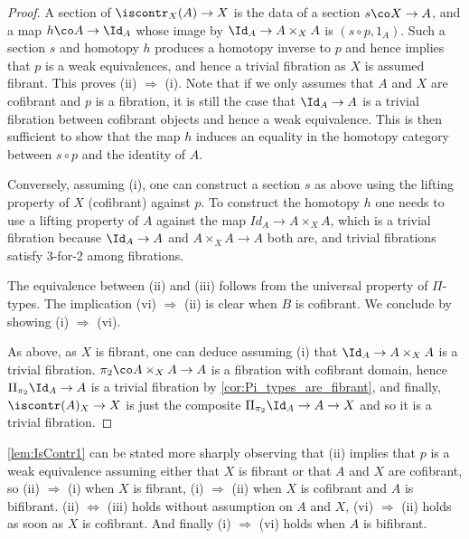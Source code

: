 \begin{proof} A section of $\iscontr_X (A) \to X$ is  the data of a section $s \co X \rightarrow A$, and a map $h \co A \to \Id_A$ whose image by $\Id_A \to A \times_X A$ is $(s \circ p, 1_A)$. Such a section $s$ and homotopy $h$ produces a homotopy inverse to $p$ and hence implies that $p$ is a weak equivalences, and hence a trivial fibration as $X$ is assumed fibrant.  This proves (ii) $\Rightarrow$ (i).
Note that if we only assumes that $A$ and $X$ are cofibrant and $p$ is a fibration, it is still the case that $\Id_A \to A$ is a trivial fibration between cofibrant objects and hence a weak equivalence. This is then sufficient to show that the map $h$ induces an equality in the homotopy category between $s \circ p $ and the identity of $A$.


Conversely, assuming (i), one can construct a section $s$ as above using the lifting property of $X$ (cofibrant) against $p$. To construct the homotopy $h$ one needs to use a lifting property of $A$ against the map $Id_A \to A \times_X A$, which is a trivial fibration because $\Id_A \to A$ and $A \times_X A \to A$ both are, and trivial fibrations satisfy 3-for-2 among fibrations.

The equivalence between (ii) and (iii) follows from the universal property of $\Pi$-types.
The implication (vi) $\Rightarrow$ (ii) is clear when $B$ is cofibrant. We conclude by showing (i) $\Rightarrow$ (vi).

As above, as $X$ is fibrant, one can deduce assuming (i) that $\Id_A \to A \times_X A$ is a trivial fibration. $\pi_2 \co A \times_X A \to A$ is a fibration with cofibrant domain, hence $\Pi_{\pi_2} \Id_A \rightarrow A$ is a trivial fibration by \cref{cor:Pi_types_are_fibrant}, and finally, $\iscontr(A)_X \rightarrow X$ is just the composite $\Pi_{\pi_2} \Id_A \rightarrow A \rightarrow X$ and so it is  a trivial fibration.
\end{proof}

\begin{remark} \label{lem:IsContr1-sharp}
 \cref{lem:IsContr1} can be stated more sharply observing that (ii) implies that $p$ is a weak equivalence assuming either that $X$ is fibrant or that $A$ and $X$ are cofibrant, so (ii) $\Rightarrow$ (i) when $X$ is fibrant, (i) $\Rightarrow$ (ii) when $X$ is cofibrant and $A$ is bifibrant.
(ii) $\Leftrightarrow$ (iii) holds without assumption on $A$ and $X$, (vi) $\Rightarrow$ (ii) holds as soon as $X$ is cofibrant. And finally (i) $\Rightarrow$ (vi) holds when $A$ is bifibrant. 
\end{remark} 

